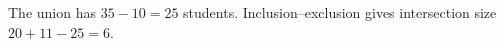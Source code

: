 The union has $35-10=25$ students. Inclusion--exclusion gives intersection size $20+11-25=\boxed6$.
